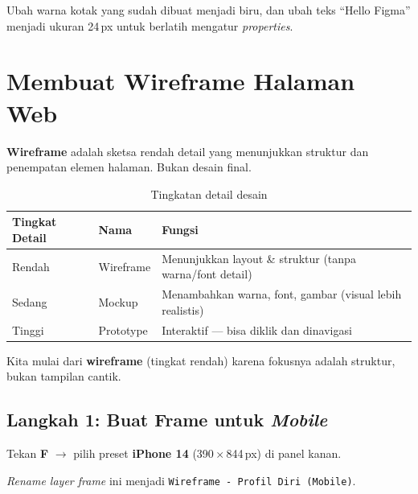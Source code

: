 \begin{tip}
Ubah warna kotak yang sudah dibuat menjadi biru, dan ubah teks ``Hello Figma'' menjadi ukuran 24\,px untuk berlatih mengatur \emph{properties}.
\end{tip}

\section{Membuat Wireframe Halaman Web}
\label{sec:m02-wireframe}

\begin{catatan}
\textbf{Wireframe} adalah sketsa rendah detail yang menunjukkan struktur dan penempatan elemen halaman. Bukan desain final.
\end{catatan}

\begin{table}[ht]
\centering
\caption{Tingkatan detail desain}
\label{tab:m02-tingkatan}
\begin{tabular}{llp{6cm}}
\toprule
\textbf{Tingkat Detail} & \textbf{Nama} & \textbf{Fungsi} \\
\midrule
Rendah & Wireframe & Menunjukkan layout \& struktur (tanpa warna/font detail) \\
Sedang & Mockup & Menambahkan warna, font, gambar (visual lebih realistis) \\
Tinggi & Prototype & Interaktif --- bisa diklik dan dinavigasi \\
\bottomrule
\end{tabular}
\end{table}

Kita mulai dari \textbf{wireframe} (tingkat rendah) karena fokusnya adalah struktur, bukan tampilan cantik.

\subsection{Langkah 1: Buat Frame untuk \emph{Mobile}}

\begin{langkah}
  \item Tekan \textbf{F} $\rightarrow$ pilih preset \textbf{iPhone 14} (390\,$\times$\,844\,px) di panel kanan.
  \item \emph{Rename layer frame} ini menjadi \texttt{Wireframe - Profil Diri (Mobile)}.
\end{langkah}


